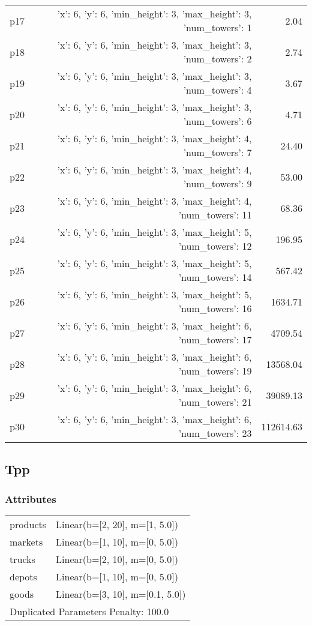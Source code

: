 \documentclass{article}
\begin{document}
\begin{center}
\begin{tabular}{@{}l|r|r@{}}
  p17&{'x': 6, 'y': 6, 'min\_height': 3, 'max\_height': 3, 'num\_towers': 1}&2.04\\
  p18&{'x': 6, 'y': 6, 'min\_height': 3, 'max\_height': 3, 'num\_towers': 2}&2.74\\
  p19&{'x': 6, 'y': 6, 'min\_height': 3, 'max\_height': 3, 'num\_towers': 4}&3.67\\
  p20&{'x': 6, 'y': 6, 'min\_height': 3, 'max\_height': 3, 'num\_towers': 6}&4.71\\
  p21&{'x': 6, 'y': 6, 'min\_height': 3, 'max\_height': 4, 'num\_towers': 7}&24.40\\
  p22&{'x': 6, 'y': 6, 'min\_height': 3, 'max\_height': 4, 'num\_towers': 9}&53.00\\
  p23&{'x': 6, 'y': 6, 'min\_height': 3, 'max\_height': 4, 'num\_towers': 11}&68.36\\
  p24&{'x': 6, 'y': 6, 'min\_height': 3, 'max\_height': 5, 'num\_towers': 12}&196.95\\
  p25&{'x': 6, 'y': 6, 'min\_height': 3, 'max\_height': 5, 'num\_towers': 14}&567.42\\
  p26&{'x': 6, 'y': 6, 'min\_height': 3, 'max\_height': 5, 'num\_towers': 16}&1634.71\\
  p27&{'x': 6, 'y': 6, 'min\_height': 3, 'max\_height': 6, 'num\_towers': 17}&4709.54\\
  p28&{'x': 6, 'y': 6, 'min\_height': 3, 'max\_height': 6, 'num\_towers': 19}&13568.04\\
  p29&{'x': 6, 'y': 6, 'min\_height': 3, 'max\_height': 6, 'num\_towers': 21}&39089.13\\
  p30&{'x': 6, 'y': 6, 'min\_height': 3, 'max\_height': 6, 'num\_towers': 23}&112614.63
                            \end{tabular}
                            \end{center}
                    
                            \newpage \subsection{Tpp}
                    \subsubsection*{Attributes}
                    \begin{tabular}{@{}p{}p{}@{}}
                    \toprule
                    products & Linear(b=[2, 20], m=[1, 5.0])\\
markets & Linear(b=[1, 10], m=[0, 5.0])\\
trucks & Linear(b=[2, 10], m=[0, 5.0])\\
depots & Linear(b=[1, 10], m=[0, 5.0])\\
goods & Linear(b=[3, 10], m=[0.1, 5.0]) \\
                    \bottomrule
                    \multicolumn{2}{l}{Duplicated Parameters Penalty: 100.0}
                    \end{tabular}
                
\end{document}
